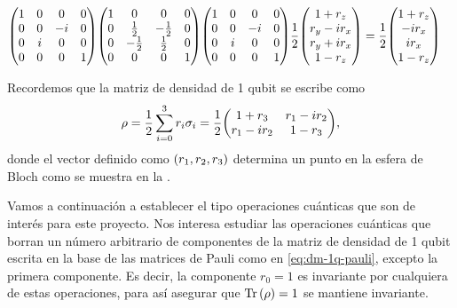 \begin{align}
\mqty(
 1 & 0 & 0 & 0 \\
 0 & 0 & -i & 0 \\
 0 & i & 0 & 0 \\
 0 & 0 & 0 & 1 
)
\mqty(
 1 & 0 & 0 & 0 \\
 0 & \frac{1}{2} & -\frac{1}{2} & 0 \\
 0 & -\frac{1}{2} & \frac{1}{2} & 0 \\
 0 & 0 & 0 & 1 
)
\mqty(
 1 & 0 & 0 & 0 \\
 0 & 0 & -i & 0 \\
 0 & i & 0 & 0 \\
 0 & 0 & 0 & 1 
)
\frac{1}{2}
\mqty(
1+r_z\\r_y-ir_x\\r_y+ir_x\\1-r_z
)&=
\frac{1}{2}
\mqty(
1+r_z\\-ir_x\\ir_x\\1-r_z
)
\end{align}

Recordemos que la matriz de densidad de 1 qubit se escribe como
\begin{align}
\rho = \frac{1}{2}\sum_{i=0}^3r_i\sigma_i
=\frac{1}{2}\mqty(1+r_3 & r_1-ir_2\\
r_1-ir_2 & 1-r_3),
\label{eq:dm-1q-pauli}
\end{align}
donde el vector definido como $\qty(r_1,r_2,r_3)$ 
determina un punto en la esfera de Bloch como se 
muestra en la \Fref{}. 

Vamos a continuación a establecer el tipo operaciones cuánticas
que son de interés para este proyecto. Nos interesa estudiar 
las operaciones cuánticas que borran un número arbitrario 
de componentes de la matriz de densidad de 1 qubit 
escrita en la base de las matrices de Pauli 
como en \eqref{eq:dm-1q-pauli}, excepto la primera 
componente. Es decir, la componente $r_0=1$ es invariante 
por cualquiera de estas operaciones, para así asegurar que 
$\Tr\qty(\rho)=1$ se mantiene invariante.

